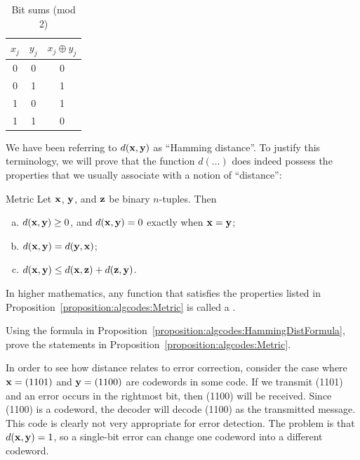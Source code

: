 \begin{table}[htb]
\caption{Bit sums (mod 2)}{\small
\begin{center}
\begin{tabular}{c c c }
\hline
 $x_j$ & $y_j$ & $x_j \oplus y_j$\\  [0.5ex]
 \hline
0 & 0 & 0\\
0 & 1 & 1\\
1 & 0 & 1\\
1 & 1 & 0\\
\hline
\end{tabular}
\label{algcodes:table3}
\end{center}
}
\end{table}
 
We have been referring to $d( {\bold x}, {\bold y})$ as ``Hamming distance''. To justify this terminology, we will prove that the function $d(\ldots)$ does indeed possess the properties that we usually associate with a notion of ``distance'': 
 
\begin{prop}{Metric}
Let ${\bold x}$, ${\bold y}$, and ${\bold z}$ be binary $n$-tuples.
Then 
\begin{enumerate}[(a)]
\item
$d( {\bold x}, {\bold y}) \geq 0$, and 
$d( {\bold x}, {\bold y}) = 0$ exactly when ${\bold x} = {\bold y}$; 
 
\item
$d( {\bold x}, {\bold y})= d( {\bold y}, {\bold x})$; 
 
\item
$d( {\bold x}, {\bold y}) \leq d( {\bold x}, {\bold z}) + d( {\bold
z}, {\bold y})$. 
 
\end{enumerate}
\end{prop}

In higher mathematics, any function that satisfies the properties listed in Proposition~\ref{proposition:algcodes:Metric} is called a .

 \begin{exercise}{}
 Using the formula in Proposition~\ref{proposition:algcodes:HammingDistFormula}, prove the statements in Proposition~\ref{proposition:algcodes:Metric}.
 \end{exercise}
In order to see how distance relates to error correction, consider the case where ${\bold x} = (1101)$ and ${\bold y} = (1100)$ are
codewords in some code. If we transmit (1101) and an error occurs in
the rightmost bit, then (1100) will be received. Since (1100) is a
codeword, the decoder will decode (1100) as the transmitted message.
This code is clearly not very appropriate for error detection. The
problem is that $d({\bold x}, {\bold y}) = 1$, so a single-bit error can change one codeword into a different codeword. 

